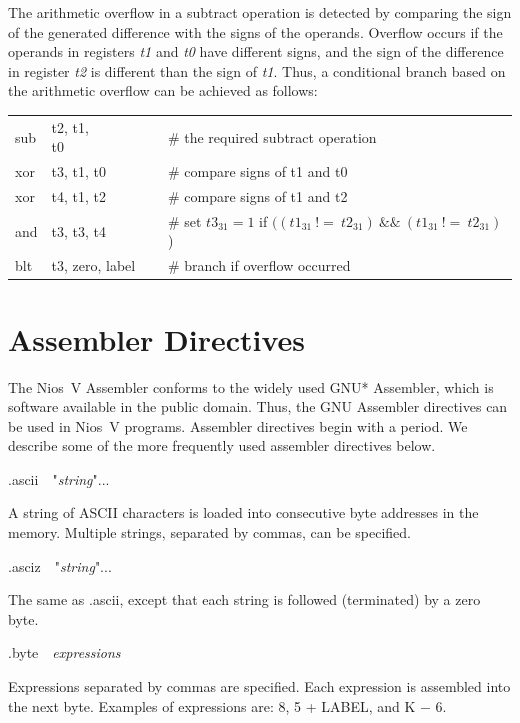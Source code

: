 \documentclass[11pt, twoside, pdftex]{article}
\begin{document}
\noindent
The arithmetic overflow in a subtract operation is detected by comparing the sign of the generated 
difference with the signs of the operands. Overflow occurs if the operands in registers
{\it t1} and {\it t0} have different signs, and the sign of the difference in register 
{\it t2} is different than the sign of {\it t1}.
Thus, a conditional branch based on the arithmetic overflow can be achieved as follows:
\begin{center}
\begin{tabular}{lll}
{\sf sub} & {\sf t2, t1, t0}~~~~~~~ & \# the required subtract operation \\
{\sf xor} & {\sf t3, t1, t0}  & \# compare signs of t1 and t0 \\
{\sf xor} & {\sf t4, t1, t2}  & \# compare signs of t1 and t2 \\
{\sf and} & {\sf t3, t3, t4}  & \# set $\mathit{t3}_{31} = 1$ if $((\mathit{t1}_{31}~!=~\mathit{t2}_{31})~\&\&~(\mathit{t1}_{31}~!=~\mathit{t2}_{31})$) \\
{\sf blt} & {\sf t3, zero, label} & \# branch if overflow occurred
\end{tabular}
\end{center}
 
\section{Assembler Directives}

The Nios~V Assembler conforms to the widely used GNU* Assembler, which is 
software available in the public domain. Thus, the GNU Assembler directives can
be used in Nios~V programs. Assembler directives begin with a period. 
We describe some of the more frequently used assembler directives below.

\noindent
{\sf .ascii}~~"{\it string}"...
 
\noindent
A string of ASCII characters is loaded into consecutive byte addresses in the memory.
Multiple strings, separated by commas, can be specified.
 
\noindent
{\sf .asciz}~~"{\it string}"...

\noindent
The same as {\sf .ascii}, except that each string is followed (terminated) by a zero byte.

\noindent
{\sf .byte}~~{\it expressions}

\noindent
Expressions separated by commas are specified. Each expression is assembled into
the next byte. Examples of expressions are: 8, 5 + LABEL, and K $-$ 6.
 
\end{document}
